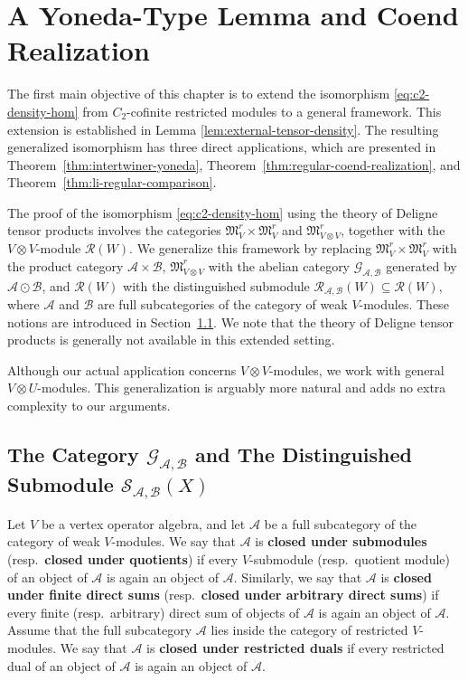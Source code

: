 \documentclass[12pt, english]{article}
\numberwithin{equation}{section}
\theoremstyle{plain}
\theoremstyle{definition}
\theoremstyle{remark}
\begin{document}
	\section{A Yoneda-Type Lemma and Coend Realization}\label{sec:yoneda-and-coend}
	
	The first main objective of this chapter is to extend the isomorphism \eqref{eq:c2-density-hom} from $C_2$-cofinite restricted modules to a general framework.
	This extension is established in Lemma \ref{lem:external-tensor-density}.
	The resulting generalized isomorphism has three direct applications, which are presented in
	Theorem~\ref{thm:intertwiner-yoneda}, Theorem~\ref{thm:regular-coend-realization}, and Theorem~\ref{thm:li-regular-comparison}.
	
	The proof of the isomorphism \eqref{eq:c2-density-hom} using the theory of Deligne tensor products involves the categories $\mathfrak{M}^r_V \times \mathfrak{M}^r_V$ and $\mathfrak{M}^r_{V\otimes V}$, together with the $V\otimes V$-module $\mathcal{R}(W)$. We generalize this framework by replacing $\mathfrak{M}^r_V \times \mathfrak{M}^r_V$ with the product category $\mathcal{A}\times\mathcal{B}$, $\mathfrak{M}^r_{V\otimes V}$ with the abelian category $\mathcal{G}_{\mathcal{A}, \mathcal{B}}$ generated by $\mathcal{A}\odot\mathcal{B}$, and $\mathcal{R}(W)$ with the distinguished submodule $\mathcal{R}_{\mathcal{A}, \mathcal{B}}(W) \subseteq \mathcal{R}(W)$, where $\mathcal{A}$ and $\mathcal{B}$ are full subcategories of the category of weak $V$-modules.
	These notions are introduced in Section~\ref{subsec:generated-modules}.
	We note that the theory of Deligne tensor products is generally not available in this extended setting.
	
	Although our actual application concerns $V\otimes V$-modules,
	we work with general $V\otimes U$-modules. This generalization is arguably more natural and adds no extra complexity to our arguments.
	
	\subsection{ The Category \texorpdfstring{$ \mathcal{G}_{\mathcal{A}, \mathcal{B}}$}{G\_(A, B)} and The Distinguished Submodule  \texorpdfstring{$\mathcal{S}_{\mathcal{A}, \mathcal{B}}(X) $}{S\_(A, B)(X)} } \label{subsec:generated-modules}
	
	
	Let $V$ be a vertex operator algebra, and let $\mathcal{A}$ be a full subcategory of the category of weak $V$-modules.
	We say that $\mathcal{A}$ is \textbf{closed under submodules} (resp.\ \textbf{closed under quotients}) if every $V$-submodule (resp.\ quotient module) of an object of $\mathcal{A}$ is again an object of $\mathcal{A}$. Similarly, we say that $\mathcal{A}$ is \textbf{closed under finite direct sums} (resp.\ \textbf{closed under arbitrary direct sums}) if every finite (resp.\ arbitrary) direct sum of objects of $\mathcal{A}$ is again an object of $\mathcal{A}$.
	Assume that the full subcategory $\mathcal{A}$ lies inside the category of restricted $V$-modules.
	We say that $\mathcal{A}$ is \textbf{closed under restricted duals} if every restricted dual of an object of $\mathcal{A}$ is again an object of $\mathcal{A}$.
	
\end{document}
